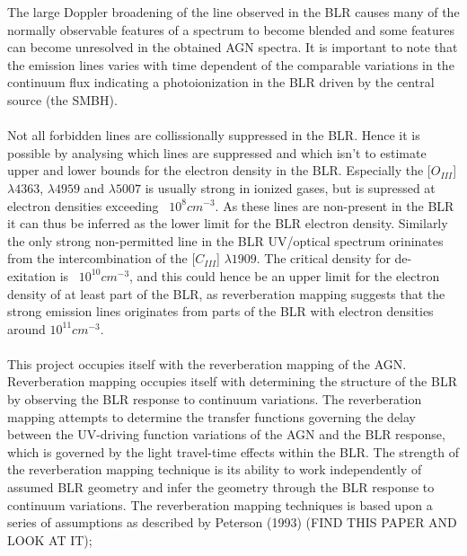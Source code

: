 \documentclass[a4paper, 12pt, twoside]{article}
\begin{document}
The large Doppler broadening of the line observed in the BLR causes many of the normally observable features of a spectrum to become blended and some features can become unresolved in the obtained AGN spectra. It is important to note that the emission lines varies with time dependent of the comparable variations in the continuum flux indicating a photoionization in the BLR driven by the central source (the SMBH). \\
\\
Not all forbidden lines are collissionally suppressed in the BLR. Hence it is possible by analysing which lines are suppressed and which isn't to estimate upper and lower bounds for the electron density in the BLR. Especially the [$O_{III}$] $\lambda 4363$, $\lambda 4959$ and $\lambda 5007$ is usually strong in ionized gases, but is supressed at electron densities exceeding ~$10^{8} cm^{-3}$. As these lines are non-present in the BLR it can thus be inferred as the lower limit for the BLR electron density. Similarly the only strong non-permitted line in the BLR UV/optical spectrum orininates from the intercombination of the [$C_{III}$] $\lambda 1909$. The critical density for de-exitation is ~$10^{10} cm^{-3}$, and this could hence be an upper limit for the electron density of at least part of the BLR, as reverberation mapping suggests that the strong emission lines originates from parts of the BLR with electron densities around $10^{11} cm^{-3}$. \\
\\
This project occupies itself with the reverberation mapping of the AGN. Reverberation mapping occupies itself with determining the structure of the BLR by observing the BLR response to continuum variations. The reverberation mapping attempts to determine the transfer functions governing the delay between the UV-driving function variations of the AGN and the BLR response, which is governed by the light travel-time effects within the BLR. The strength of the reverberation mapping technique is its ability to work independently of assumed BLR geometry and infer the geometry through the BLR response to continuum variations. The reverberation mapping techniques is based upon a series of assumptions as described by Peterson (1993) (FIND THIS PAPER AND LOOK AT IT);
\end{document}
